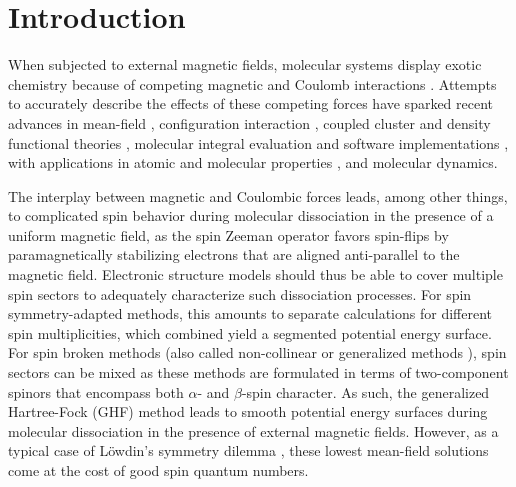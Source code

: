 \documentclass[journal=jctc,manuscript=article]{achemso}
\begin{document}
\section{Introduction}
    When subjected to external magnetic fields, molecular systems display exotic chemistry because of competing magnetic and Coulomb interactions \cite{Schmelcher.1989, Schmelcher.1997, Lange.2012, Schmelcher.2012}. Attempts to accurately describe the effects of these competing forces have sparked recent advances in mean-field \cite{Tellgren.2008, Tellgren.2013, Boblest.2014, Reynolds.2014, Sen.2018, Sen.2018a, Sen.2019, Sun.2019, Lehtola.2019, Bischoff.2020}, configuration interaction \cite{Lange.2012, Reynolds.2018, Austad.2020}, coupled cluster \cite{Stopkowicz.2015, Stopkowicz.2018, Hampe.2017, Hampe.2019, Hampe.2020, Thomas.2021} and density functional theories \cite{Sagvolden.2013, Tellgren.2014, Furness.2015, Reimann.2015, Furness.2016, Reimann.2017, Reimann.2018, Laestadius.2019, Irons.2020, Sen.2021, Irons.2021a, Laestadius.2021, Kvaal.2021}, molecular integral evaluation \cite{Tellgren.2008, Tellgren.2012, Irons.2017, Sun.2019, Pausch.2020, Blaschke.2021} and software implementations \cite{LONDON, QCUMBRE, QUEST, Shiozaki.2018, Al-Saadon.2019, Williams-Young.2020, Matthews.2020}, with applications in atomic and molecular properties \cite{Zarycz.2016, Tellgren.2009, Holzer.2019, Sun.2019a, Stetina.2019, Sun.2020, Pagola.2019, Lazzeretti.2020, Wibowo.2021}, and molecular dynamics.\cite{Culpitt.2021, Peters.2021}
    
    The interplay between magnetic and Coulombic forces leads, among other things, to complicated spin behavior during molecular dissociation in the presence of a uniform magnetic field, as the spin Zeeman operator favors spin-flips by paramagnetically stabilizing electrons that are aligned anti-parallel to the magnetic field. 
    Electronic structure models should thus be able to cover multiple spin sectors to adequately characterize such dissociation processes.
    For spin symmetry-adapted methods, this amounts to separate calculations for different spin multiplicities,\cite{Stopkowicz.2015, Sun.2019} which combined yield a segmented potential energy surface. 
    For spin broken methods (also called non-collinear or generalized methods \cite{Small.2015, Henderson.2018}), spin sectors can be mixed as these methods are formulated in terms of two-component spinors that encompass both $\alpha$- and $\beta$-spin character.
    As such, the generalized Hartree-Fock (GHF) method \cite{Fukutome.1981, Lowdin.1992, Hammes-Schiffer.1993, Mayer.1993, Jimenez-Hoyos.2011, Jake.2018, Sen.2018, Sun.2019} leads to smooth potential energy surfaces during molecular dissociation in the presence of external magnetic fields.
    However, as a typical case of Löwdin's symmetry dilemma \cite{Lykos.1963}, these lowest mean-field solutions come at the cost of good spin quantum numbers.
\end{document}
